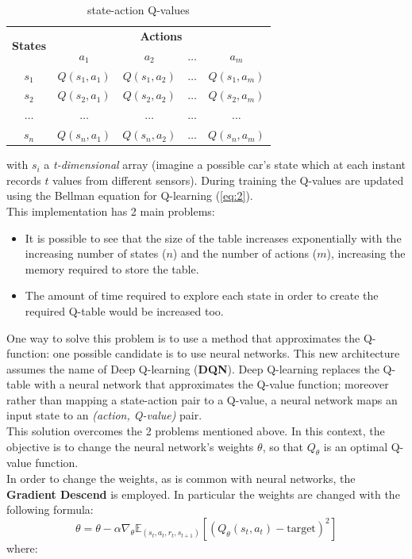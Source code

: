 \documentclass[14pt]{extarticle}
\def\pp{\vspace{10pt}\newline}
\def\ppn{\vspace{10pt}}
\begin{document}
\begin{flushleft}
\begin{table}[H]
\centering
\begin{tabular}{|c|c|c|c|c|}
\hline
\multirow{2}{*}{\textbf{States}} & \multicolumn{4}{c|}{\textbf{Actions}}                                \\ \cline{2-5} 
                                 & \textbf{$a_1$} & \textbf{$a_2$} & \textbf{$\dotso$} & \textbf{$a_m$} \\ \hline
$s_1$  				& $Q(s_1,a_1)$   				& $Q(s_1,a_2)$  				&  $\dotso$  				& $Q(s_1,a_m)$                \\ \hline
$s_2$  				& $Q(s_2,a_1)$   				& $Q(s_2,a_2)$  				&  $\dotso$  				& $Q(s_2,a_m)$                \\ \hline
$\dotso$      &  $\dotso$              	& $\dotso$              	&  $\dotso$              & $\dotso$              \\ \hline
$s_n$  				& $Q(s_n,a_1)$   				& $Q(s_n,a_2)$  				&  $\dotso$  				& $Q(s_n,a_m)$                \\ \hline
\end{tabular}
\caption{state-action Q-values}
\label{tab:my-table}
\end{table}
with $s_i$ a \emph{t-dimensional} array (imagine a possible car's state which at each instant records $t$ values from different sensors).
During training the Q-values are updated using the Bellman equation for Q-learning (\ref{eq:2}).
\\
This implementation has 2 main problems:
\begin{itemize}
\item It is possible to see that the size of the table increases exponentially with the increasing number of states ($n$) and the number of actions ($m$), increasing the memory required to store the table.
\item The amount of time required to explore each state in order to create the required Q-table would be increased too.
\end{itemize}

\ppn
One way to solve this problem is to use a method that approximates the Q-function: one possible candidate is to use neural networks. This new architecture assumes the name of Deep Q-learning (\textbf{DQN}). Deep Q-learning replaces the Q-table with a neural network that approximates the Q-value function; moreover rather than mapping a state-action pair to a Q-value, a neural network maps an input state to an \emph{(action, Q-value)} pair.
\\
This solution overcomes the 2 problems mentioned above.
\pp
In this context, the objective is to change the neural network's weights $\theta$, so that $Q_{\theta}$ is an optimal Q-value function. \\
In order to change the weights, as is common with neural networks, the \textbf{Gradient Descend} is employed. In particular the weights are changed with the following formula:
\[ \theta = \theta - \alpha\nabla_{\theta}\mathbb{E}_{(s_t,a_t,r_t,s_{t+1})}[(Q_{\theta}(s_t,a_t) - \text{target})^2]\]
where:


\end{flushleft}
\end{document}
